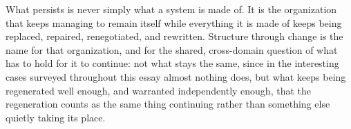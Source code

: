 \documentclass[11pt]{article}
\begin{document}
What persists is never simply what a system is made of. It is the organization that keeps managing to remain itself while everything it is made of keeps being replaced, repaired, renegotiated, and rewritten. Structure through change is the name for that organization, and for the shared, cross-domain question of what has to hold for it to continue: not what stays the same, since in the interesting cases surveyed throughout this essay almost nothing does, but what keeps being regenerated well enough, and warranted independently enough, that the regeneration counts as the same thing continuing rather than something else quietly taking its place.
\end{document}
